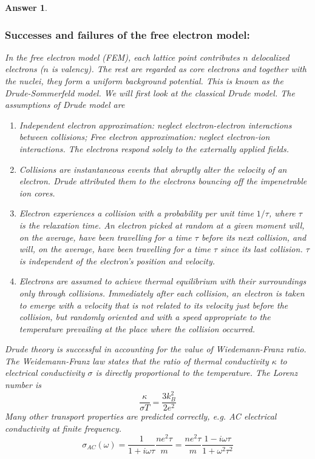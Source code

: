 \documentclass[a4paper]{article}
\newtheorem{ans}{Answer}[subsection]
\theoremstyle{new}
\begin{document}
\begin{ans}\leavevmode
\subsubsection*{Successes and failures of the free electron model:}
In the free electron model (FEM), each lattice point contributes $n$ delocalized electrons ($n$ is valency). The rest are regarded as core electrons and together with the nuclei, they form a uniform background potential. This is known as the Drude-Sommerfeld model. We will first look at the classical Drude model. The assumptions of Drude model are
\begin{enumerate}
    \item Independent electron approximation: neglect electron-electron interactions between collisions; Free electron approximation: neglect electron-ion interactions. The electrons respond solely to the externally applied fields.
    \item Collisions are instantaneous events that abruptly alter the velocity of an electron. Drude attributed them to the electrons bouncing off the impenetrable ion cores.
    \item Electron experiences a collision with a probability per unit time $1/\tau$, where $\tau$ is the relaxation time. An electron picked at random at a given moment will, on the average, have been travelling for a time $\tau$ before its next collision, and will, on the average, have been travelling for a time $\tau$ since its last collision. $\tau$ is independent of the electron's position and velocity.
    \item Electrons are assumed to achieve thermal equilibrium with their surroundings only through collisions. Immediately after each collision, an electron is taken to emerge with a velocity that is not related to its velocity just before the collision, but randomly oriented and with a speed appropriate to the temperature prevailing at the place where the collision occurred.
\end{enumerate}
Drude theory is successful in accounting for the value of Wiedemann-Franz ratio. The Weidemann-Franz law states that the ratio of thermal conductivity $\kappa$ to electrical conductivity $\sigma$ is directly proportional to the temperature. The Lorenz number is
$$\frac{\kappa}{\sigma T}=\frac{3k_B^2}{2e^2}$$
Many other transport properties are predicted correctly, e.g. AC electrical conductivity at finite frequency. 
$$\sigma_{AC}(\omega)=\frac{1}{1+i\omega\tau}\frac{ne^2\tau}{m}=\frac{ne^2\tau}{m}\frac{1-i\omega\tau}{1+\omega^2\tau^2}$$

\end{ans}
\end{document}
